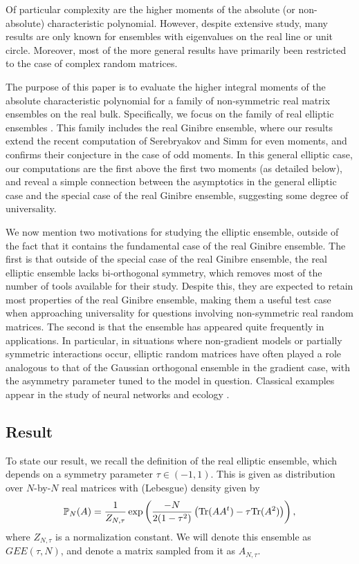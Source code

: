 \documentclass[12pt]{article}
\newcommand{\Tr}{\text{\rm Tr}}
\numberwithin{info}{section}
\numberwithin{equation}{section}
\renewcommand{\[}{\begin{equation}}
\renewcommand{\]}{\end{equation}}
\renewcommand{\P}{\mathbb{P}}
\newcommand{\<}{\langle}
\renewcommand{\>}{\rangle}
\begin{document}
	Of particular complexity are the higher moments of the absolute (or non-absolute) characteristic polynomial. However, despite extensive study, many results are only known for ensembles with eigenvalues on the real line or unit circle. Moreover, most of the more general results have primarily been restricted to the case of complex random matrices. 
	
	The purpose of this paper is to evaluate the higher integral moments of the absolute characteristic polynomial for a family of non-symmetric real matrix ensembles on the real bulk. Specifically, we focus on the family of real elliptic ensembles \cite{sommers-elliptic}. This family includes the real Ginibre ensemble, where our results extend the recent computation of Serebryakov and Simm \cite{nickrecent} for even moments, and confirms their conjecture in the case of odd moments. In this general elliptic case, our computations are the first above the first two moments (as detailed below), and reveal a simple connection between the asymptotics in the general elliptic case and the special case of the real Ginibre ensemble, suggesting some degree of universality.
	
	We now mention two motivations for studying the elliptic ensemble, outside of the fact that it contains the fundamental case of the real Ginibre ensemble. The first is that outside of the special case of the real Ginibre ensemble, the real elliptic ensemble lacks bi-orthogonal symmetry, which removes most of the number of tools available for their study. Despite this, they are expected to retain most properties of the real Ginibre ensemble, making them a useful test case when approaching universality for questions involving non-symmetric real random matrices. The second is that the ensemble has appeared quite frequently in applications. In particular, in situations where non-gradient models or partially symmetric interactions occur, elliptic random matrices have often played a role analogous to that of the Gaussian orthogonal ensemble in the gradient case, with the asymmetry parameter tuned to the model in question. Classical examples appear in the study of neural networks \cite{original-glassy,original-1,ml-complexity-1} and ecology \cite{may,fyo-maywigner-1,fyo-maywigner-2}. 
	
	\subsection{Result}
	
	To state our result, we recall the definition of the real elliptic ensemble, which depends on a symmetry parameter $\tau\in (-1,1)$. This is given as distribution over $N$-by-$N$ real matrices with (Lebesgue) density given by
	\[\P_N(A)=\frac{1}{Z_{N,\tau}}\exp\left(\frac{-N}{2(1-\tau^2)}\left(\Tr(AA^t)-\tau \Tr(A^2)\right)\right),\]
	where $Z_{N,\tau}$ is a normalization constant. We will denote this ensemble as $GEE(\tau,N)$, and denote a matrix sampled from it as $A_{N,\tau}$.
	
\end{document}
